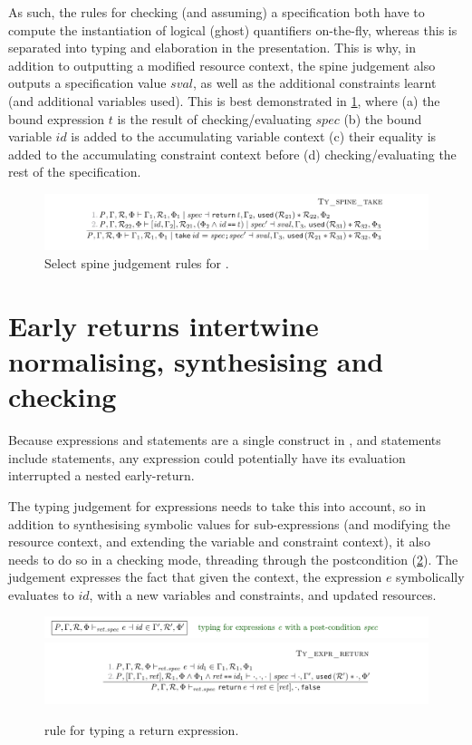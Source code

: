 As such, the rules for checking (and assuming) a specification both have to
compute the instantiation of logical (ghost) quantifiers on-the-fly, whereas
this is separated into typing and elaboration in the 
presentation. This is why, in addition to outputting a modified resource
context, the spine judgement also outputs a specification value
$\mathit{sval}$, as well as the additional constraints learnt (and additional
variables used). This is best demonstrated in \cref{fig:minicn-spine-take},
where (a) the bound expression $\mathit{t}$ is the result of
checking/evaluating $\mathit{spec}$ (b) the bound variable $\mathit{id}$ is
added to the accumulating variable context (c) their equality is added to the
accumulating constraint context before (d) checking/evaluating the rest of the
specification.

\begin{figure}[tpb]
    \ContinuedFloat{}
    \includegraphics{figures/minicn-spine-3}
    \caption{Select spine judgement rules for .}\label{fig:minicn-spine-take}
\end{figure}

\section{Early returns intertwine normalising, synthesising and checking}

Because expressions and statements are a single construct in , and
statements include  statements, any expression could
potentially have its evaluation interrupted a nested early-return.

The typing judgement for expressions needs to take this into account, so in
addition to synthesising symbolic values for sub-expressions (and modifying the
resource context, and extending the variable and constraint context), it also
needs to do so in a checking mode, threading through the postcondition
(\cref{fig:minicn-return}). The judgement expresses the fact that given the
context, the expression $\mathit{e}$ symbolically evaluates to $\mathit{id}$,
with a new variables and constraints, and updated resources.

\begin{figure}[tpb]
    \ContinuedFloat*
    \includegraphics{figures/minicn-expr-judgement}
    \includegraphics{figures/minicn-return}
    \caption{ rule for typing a return expression.}\label{fig:minicn-return}
\end{figure}

